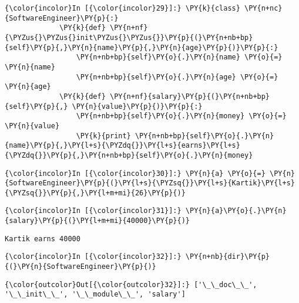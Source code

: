     \begin{Verbatim}[commandchars=\\\{\}]
{\color{incolor}In [{\color{incolor}29}]:} \PY{k}{class} \PY{n+nc}{SoftwareEngineer}\PY{p}{:}
             \PY{k}{def} \PY{n+nf}{\PYZus{}\PYZus{}init\PYZus{}\PYZus{}}\PY{p}{(}\PY{n+nb+bp}{self}\PY{p}{,}\PY{n}{name}\PY{p}{,}\PY{n}{age}\PY{p}{)}\PY{p}{:}
                 \PY{n+nb+bp}{self}\PY{o}{.}\PY{n}{name} \PY{o}{=} \PY{n}{name}
                 \PY{n+nb+bp}{self}\PY{o}{.}\PY{n}{age} \PY{o}{=} \PY{n}{age}
             \PY{k}{def} \PY{n+nf}{salary}\PY{p}{(}\PY{n+nb+bp}{self}\PY{p}{,} \PY{n}{value}\PY{p}{)}\PY{p}{:}
                 \PY{n+nb+bp}{self}\PY{o}{.}\PY{n}{money} \PY{o}{=} \PY{n}{value}
                 \PY{k}{print} \PY{n+nb+bp}{self}\PY{o}{.}\PY{n}{name}\PY{p}{,}\PY{l+s}{\PYZdq{}}\PY{l+s}{earns}\PY{l+s}{\PYZdq{}}\PY{p}{,}\PY{n+nb+bp}{self}\PY{o}{.}\PY{n}{money}
\end{Verbatim}

    \begin{Verbatim}[commandchars=\\\{\}]
{\color{incolor}In [{\color{incolor}30}]:} \PY{n}{a} \PY{o}{=} \PY{n}{SoftwareEngineer}\PY{p}{(}\PY{l+s}{\PYZsq{}}\PY{l+s}{Kartik}\PY{l+s}{\PYZsq{}}\PY{p}{,}\PY{l+m+mi}{26}\PY{p}{)}
\end{Verbatim}

    \begin{Verbatim}[commandchars=\\\{\}]
{\color{incolor}In [{\color{incolor}31}]:} \PY{n}{a}\PY{o}{.}\PY{n}{salary}\PY{p}{(}\PY{l+m+mi}{40000}\PY{p}{)}
\end{Verbatim}

    \begin{Verbatim}[commandchars=\\\{\}]
Kartik earns 40000
    \end{Verbatim}

    \begin{Verbatim}[commandchars=\\\{\}]
{\color{incolor}In [{\color{incolor}32}]:} \PY{n+nb}{dir}\PY{p}{(}\PY{n}{SoftwareEngineer}\PY{p}{)}
\end{Verbatim}

            \begin{Verbatim}[commandchars=\\\{\}]
{\color{outcolor}Out[{\color{outcolor}32}]:} ['\_\_doc\_\_', '\_\_init\_\_', '\_\_module\_\_', 'salary']
\end{Verbatim}
        
